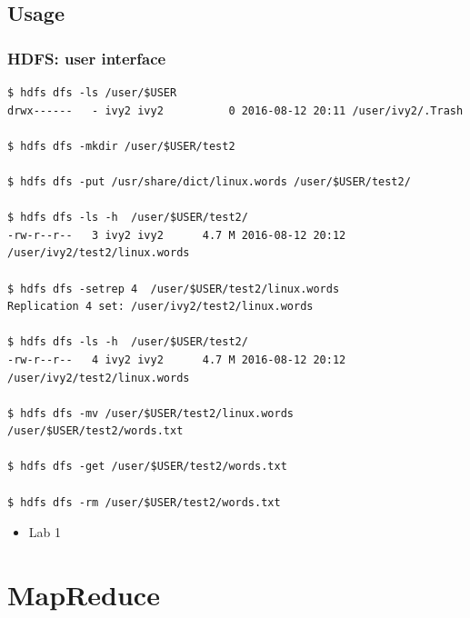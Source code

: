 \documentclass{beamer}
\begin{document}
\subsection{Usage}
\begin{frame}[fragile]
  \frametitle{HDFS: user interface}
{\color{mycolorcli}
  \begin{lstlisting}[frame=single, basicstyle=\tiny]
$ hdfs dfs -ls /user/$USER
drwx------   - ivy2 ivy2          0 2016-08-12 20:11 /user/ivy2/.Trash                                                                                                                                                                     

$ hdfs dfs -mkdir /user/$USER/test2 

$ hdfs dfs -put /usr/share/dict/linux.words /user/$USER/test2/

$ hdfs dfs -ls -h  /user/$USER/test2/
-rw-r--r--   3 ivy2 ivy2      4.7 M 2016-08-12 20:12 /user/ivy2/test2/linux.words

$ hdfs dfs -setrep 4  /user/$USER/test2/linux.words
Replication 4 set: /user/ivy2/test2/linux.words

$ hdfs dfs -ls -h  /user/$USER/test2/
-rw-r--r--   4 ivy2 ivy2      4.7 M 2016-08-12 20:12 /user/ivy2/test2/linux.words

$ hdfs dfs -mv /user/$USER/test2/linux.words /user/$USER/test2/words.txt

$ hdfs dfs -get /user/$USER/test2/words.txt

$ hdfs dfs -rm /user/$USER/test2/words.txt
  \end{lstlisting}
}

\begin{itemize}
\item Lab 1
\end{itemize}

\end{frame}


\section{MapReduce}
\end{document}
